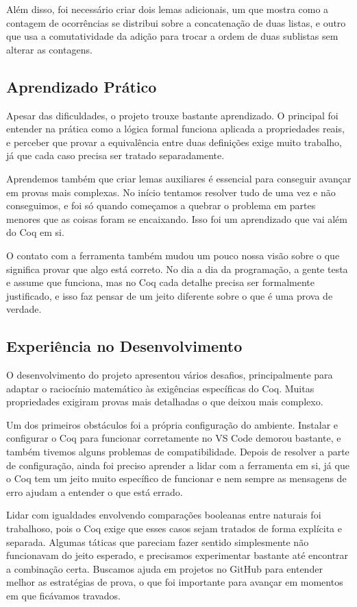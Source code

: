 \documentclass[twocolumn]{article}
\begin{document}
Além disso, foi necessário criar dois lemas adicionais, um que mostra como a contagem de ocorrências se distribui sobre a concatenação de duas listas, e outro que usa a comutatividade da adição para trocar a ordem de duas sublistas sem alterar as contagens.

\subsection{Aprendizado Prático}
Apesar das dificuldades, o projeto trouxe bastante aprendizado. O principal foi entender na prática como a lógica formal funciona aplicada a propriedades reais, e perceber que provar a equivalência entre duas definições exige muito trabalho, já que cada caso precisa ser tratado separadamente.

Aprendemos também que criar lemas auxiliares é essencial para conseguir avançar em provas mais complexas. No início tentamos resolver tudo de uma vez e não conseguimos, e foi só quando começamos a quebrar o problema em partes menores que as coisas foram se encaixando. Isso foi um aprendizado que vai além do Coq em si.

O contato com a ferramenta também mudou um pouco nossa visão sobre o que significa provar que algo está correto. No dia a dia da programação, a gente testa e assume que funciona, mas no Coq cada detalhe precisa ser formalmente justificado, e isso faz pensar de um jeito diferente sobre o que é uma prova de verdade.

\subsection{Experiência no Desenvolvimento}

O desenvolvimento do projeto apresentou vários desafios, principalmente para adaptar o raciocínio matemático às exigências específicas do Coq. Muitas propriedades exigiram provas mais detalhadas o que deixou mais complexo.

Um dos primeiros obstáculos foi a própria configuração do ambiente. Instalar e configurar o Coq para funcionar corretamente no VS Code demorou bastante, e também tivemos alguns problemas de compatibilidade. Depois de resolver a parte de configuração, ainda foi preciso aprender a lidar com a ferramenta em si, já que o Coq tem um jeito muito específico de funcionar e nem sempre as mensagens de erro ajudam a entender o que está errado.

Lidar com igualdades envolvendo comparações booleanas entre naturais foi trabalhoso, pois o Coq exige que esses casos sejam tratados de forma explícita e separada. Algumas táticas que pareciam fazer sentido simplesmente não funcionavam do jeito esperado, e precisamos experimentar bastante até encontrar a combinação certa. Buscamos ajuda em projetos no GitHub para entender melhor as estratégias de prova, o que foi importante para avançar em momentos em que ficávamos travados.
\end{document}
